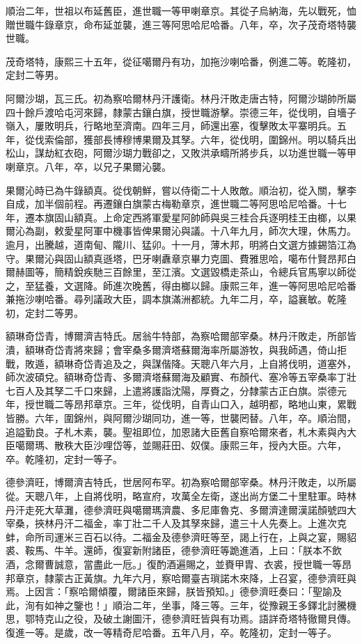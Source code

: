 \begin{pinyinscope}
順治二年，世祖以布延舊臣，進世職一等甲喇章京。其從子烏納海，先以戰死，恤贈世職牛錄章京，命布延並襲，進三等阿思哈尼哈番。八年，卒，次子茂奇塔特襲世職。

茂奇塔特，康熙三十五年，從征噶爾丹有功，加拖沙喇哈番，例進二等。乾隆初，定封二等男。

阿爾沙瑚，瓦三氏。初為察哈爾林丹汗護衛。林丹汗敗走唐古特，阿爾沙瑚帥所屬四十餘戶渡哈屯河來歸，隸蒙古鑲白旗，授世職游擊。崇德三年，從伐明，自墻子嶺入，屢敗明兵，行略地至濟南。四年三月，師還出塞，復擊敗太平寨明兵。五年，從伐索倫部，獲部長博穆博果爾及其孥。六年，從伐明，圍錦州。明以騎兵出松山，謀劫紅衣砲，阿爾沙瑚力戰卻之，又敗洪承疇所將步兵，以功進世職一等甲喇章京。八年，卒，以兄子果爾沁襲。

果爾沁時已為牛錄額真。從伐朝鮮，嘗以侍衛二十人敗敵。順治初，從入關，擊李自成，加半個前程。再遷鑲白旗蒙古梅勒章京，進世職二等阿思哈尼哈番。十七年，遷本旗固山額真。上命定西將軍愛星阿帥師與吳三桂合兵逐明桂王由榔，以果爾沁為副，敕愛星阿軍中機事皆俾果爾沁與議。十八年九月，師次大理，休馬力。逾月，出騰越，道南甸、隴川、猛卯。十一月，薄木邦，明將白文選方據錫箔江為守。果爾沁與固山額真遜塔，巴牙喇纛章京畢力克圖、費雅思哈，噶布什賢昂邦白爾赫圖等，簡精銳疾馳三百餘里，至江濱。文選毀橋走茶山，令總兵官馬寧以師從之，至猛養，文選降。師進次晚舊，得由榔以歸。康熙三年，進一等阿思哈尼哈番兼拖沙喇哈番。尋列議政大臣，調本旗滿洲都統。九年二月，卒，謚襄敏。乾隆初，定封二等男。

額琳奇岱青，博爾濟吉特氏。居翁牛特部，為察哈爾部宰桑。林丹汗敗走，所部皆潰，額琳奇岱青將來歸；會宰桑多爾濟塔蘇爾海率所屬游牧，與我師遇，倚山拒戰，敗遁，額琳奇岱青追及之，與謀偕降。天聰八年六月，上自將伐明，道塞外，師次波碩兌。額琳奇岱青、多爾濟塔蘇爾海及顧實、布顏代、塞冷等五宰桑率丁壯七百人及其孥二千口來歸，上遣將護詣沈陽，厚賚之，分隸蒙古正白旗。崇德元年，授世職二等昂邦章京。三年，從伐明，自青山口入，越明都，略地山東，累戰皆勝。六年，圍錦州，與阿爾沙瑚同功，進一等，世襲罔替。八年，卒。順治間，追謚勤良。子札木素，襲。聖祖即位，加恩諸大臣舊自察哈爾來者，札木素與內大臣噶爾瑪、散秩大臣沙哩岱等，並賜莊田、奴僕。康熙三年，授內大臣。六年，卒。乾隆初，定封一等子。

德參濟旺，博爾濟吉特氏，世居阿布罕。初為察哈爾部宰桑。林丹汗敗走，以所屬從。天聰八年，上自將伐明，略宣府，攻萬全左衛，遂出尚方堡二十里駐軍。時林丹汗走死大草灘，德參濟旺與噶爾瑪濟農、多尼庫魯克、多爾濟達爾漢諾顏號四大宰桑，挾林丹汗二福金，率丁壯二千人及其孥來歸，遣三十人先奏上。上進次克蚌，命所司運米三百石以待。二福金及德參濟旺等至，謁上行在，上與之宴，賜貂裘、鞍馬、牛羊。還師，復宴新附諸臣，德參濟旺等跪進酒，上曰：「朕本不飲酒，念爾曹誠意，當盡此一卮。」復酌酒遍賜之，並賚甲胄、衣裘，授世職一等昂邦章京，隸蒙古正黃旗。九年六月，察哈爾臺吉瑣諾木來降，上召宴，德參濟旺與焉。上因言：「察哈爾傾覆，爾諸臣來歸，朕皆預知。」德參濟旺奏曰：「聖諭及此，洵有如神之鑒也！」順治二年，坐事，降三等。三年，從豫親王多鐸北討騰機思，鄂特克山之役，及破土謝圖汗，德參濟旺皆與有功焉。語詳奇塔特徹爾貝傳。復進一等。是歲，改一等精奇尼哈番。五年八月，卒。乾隆初，定封一等子。


\end{pinyinscope}
